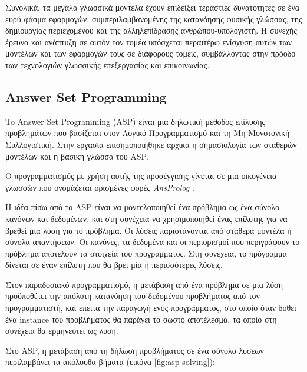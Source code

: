\documentclass[12pt]{extarticle}
\begin{document}
Συνολικά, τα μεγάλα γλωσσικά μοντέλα έχουν επιδείξει τεράστιες δυνατότητες σε ένα ευρύ φάσμα εφαρμογών, συμπεριλαμβανομένης της κατανόησης φυσικής γλώσσας, της δημιουργίας περιεχομένου και της αλληλεπίδρασης ανθρώπου-υπολογιστή. Η συνεχής έρευνα και ανάπτυξη σε αυτόν τον τομέα υπόσχεται περαιτέρω ενίσχυση αυτών των μοντέλων και των εφαρμογών τους σε διάφορους τομείς, συμβάλλοντας στην πρόοδο των τεχνολογιών γλωσσικής επεξεργασίας και επικοινωνίας.

\subsection{Answer Set Programming}
To Answer Set Programming (ASP) \cite{Eiter2009} είναι μια δηλωτική μέθοδος επίλυσης προβλημάτων που βασίζεται στον Λογικό Προγραμματισμό και τη Μη Μονοτονική Συλλογιστική.  
Στην εργασία \cite{Gelfond2000} επισημοποιήθηκε αρχικά η σημασιολογία των σταθερών μοντέλων και η βασική γλώσσα του ASP.

Ο προγραμματισμός με χρήση αυτής της προσέγγισης γίνεται σε μια οικογένεια γλωσσών που ονομάζεται ορισμένες φορές \textit{AnsProlog} \cite{Gelfond2002}.

Η ιδέα πίσω από το ASP είναι να μοντελοποιηθεί ένα πρόβλημα ως ένα σύνολο κανόνων και δεδομένων, και στη συνέχεια να χρησιμοποιηθεί ένας επίλυτης για να βρεθεί μια λύση για το πρόβλημα. Οι λύσεις παριστάνονται από σταθερά μοντέλα ή σύνολα απαντήσεων. Οι κανόνες, τα δεδομένα και οι περιορισμοί που περιγράφουν το πρόβλημα αποτελούν τα στοιχεία του προγράμματος. Στη συνέχεια, το πρόγραμμα δίνεται σε έναν επίλυτη που θα βρει μία ή περισσότερες λύσεις. 

Στον παραδοσιακό προγραμματισμό, η μετάβαση από ένα πρόβλημα σε μια λύση προϋποθέτει την απόλυτη κατανόηση του δεδομένου προβλήματος από τον προγραμματιστή, και έπειτα την παραγωγή ενός προγράμματος, στο οποίο όταν δοθεί ένα instance του προβλήματος θα παράγει το σωστό αποτέλεσμα, τα οποίο στη συνέχεια θα ερμηνευτεί ως λύση.

Στο ASP, η μετάβαση από τη δήλωση προβλήματος σε ένα σύνολο λύσεων περιλαμβάνει τα ακόλουθα βήματα \cite{Gebser2013}
(εικόνα \ref{fig:asp-solving}):
\end{document}
